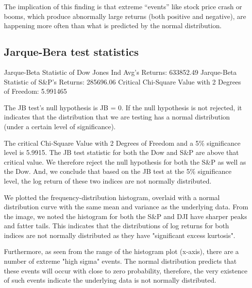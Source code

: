 \documentclass[a4paper]{article}
\begin{document}
	The implication of this finding is that extreme “events” like stock price crash or booms, which produce abnormally large returns (both positive and negative), are happening more often than what is predicted by the normal distribution.
	
	
	\subsection{Jarque-Bera test statistics}
	\begin{flushleft}
		Jarque-Beta Statistic of Dow Jones Ind Avg's Returns: 633852.49\linebreak
		Jarque-Beta Statistic of S\&P's Returns: 285696.06\linebreak
		Critical Chi-Square Value with 2 Degrees of Freedom: 5.991465\linebreak
	\end{flushleft}
	\vspace{-7mm}
	The JB test’s null hypothesis is JB = 0. If the null hypothesis is not rejected, it indicates that the distribution that we are testing has a normal distribution (under a certain level of significance).  
	
	The critical Chi-Square Value with 2 Degrees of Freedom and a 5\% significance level is 5.9915. The JB test statistic for both the Dow and S\&P are above that critical value. We therefore reject the null hypothesis for both the S\&P as well as the Dow. And, we conclude that based on the JB test at the 5\% significance level, the log return of these two indices are not normally distributed.
	
	We plotted the frequency-distribution histogram, overlaid with a normal distribution curve with the same mean and variance as the underlying data. From the image, we noted the histogram for both the S\&P and DJI have sharper peaks and fatter tails. This indicates that the distributions of log returns for both indices are not normally distributed as they have "significant excess kurtosis".
	
	Furthermore, as seen from the range of the histogram plot (x-axis), there are a number of extreme "high sigma" events. The normal distribution predicts that these events will occur with close to zero probability, therefore, the very existence of such events indicate the underlying data is not normally distributed. 
\end{document}
